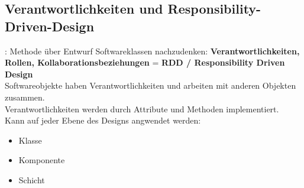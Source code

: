 \documentclass[../ZF_SWEN1.tex]{subfiles}
\begin{document}
\subsection{Verantwortlichkeiten und Responsibility-Driven-Design}:
Methode über Entwurf Softwareklassen nachzudenken:
\textcolor {yelloworange} {\textbf{Verantwortlichkeiten, Rollen, Kollaborationsbeziehungen}} = \textbf{RDD / Responsibility Driven Design}\\

Softwareobjekte haben Verantwortlichkeiten und arbeiten mit anderen Objekten zusammen.\\
Verantwortlichkeiten werden durch Attribute und Methoden implementiert.\\
Kann auf jeder Ebene des Designs angwendet werden:
\begin{itemize}
	\item Klasse
	\item Komponente
	\item Schicht
\end{itemize}
\end{document}
